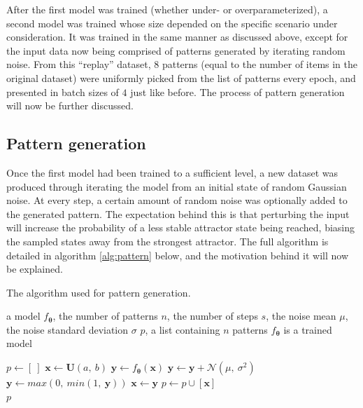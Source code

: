 \documentclass[11pt]{article}
\theoremstyle{remark}
\begin{document}
After the first model was trained (whether under- or overparameterized), a second model was trained whose size depended on the specific scenario under consideration. It was trained in the same manner as discussed above, except for the input data now being comprised of patterns generated by iterating random noise. From this ``replay'' dataset, $8$ patterns (equal to the number of items in the original dataset) were uniformly picked from the list of patterns every epoch, and presented in batch sizes of $4$ just like before. The process of pattern generation will now be further discussed.

\subsection{Pattern generation}

Once the first model had been trained to a sufficient level, a new dataset was produced through iterating the model from an initial state of random Gaussian noise. At every step, a certain amount of random noise was optionally added to the generated pattern. The expectation behind this is that perturbing the input will increase the probability of a less stable attractor state being reached, biasing the sampled states away from the strongest attractor. The full algorithm is detailed in algorithm \ref{alg:pattern} below, and the motivation behind it will now be explained.

\algnewcommand{}
\algnewcommand\Input{\item[\algorithmicinput]}

\algnewcommand{}
\algnewcommand\Output{\item[\algorithmicoutput]}

\begin{algorithm}
  \caption{The algorithm used for pattern generation.}
  \label{alg:pattern}
  \begin{algorithmic}
    \Input a model $f_{\bm{\theta}}$, the number of patterns $n$, the number of steps $s$, the noise mean $\mu$, the noise standard deviation $\sigma$
    \Output $p$, a list containing $n$ patterns
    \Require $f_{\bm{\theta}}$ is a trained model

    \State $p \gets [\ ]$
    \State $\bm{x} \gets \bm{U}(a,\ b)$ 
    \State $\bm{y} \gets f_{\bm{\theta}}(\bm{x})$  
    \State $\bm{y} \gets \bm{y} + \bm{\mathcal{N}}(\mu,\ \sigma^2)$ 
    \State $\bm{y} \gets max(0,\ min(1,\ \bm{y}))$  
    \State $\bm{x} \gets \bm{y}$
    \EndFor
    \State $p \gets p \cup [\bm{x}]$
    \EndFor
    \\
    \Return $p$
  \end{algorithmic}
\end{algorithm}
\end{document}
